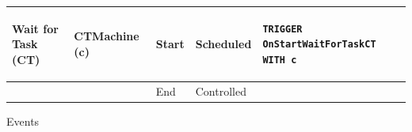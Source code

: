 \documentclass[
  10pt,
  a4paperpaper,
  DIV=11,
  numbers=noendperiod,
  oneside]{scrreprt}
\begin{document}
\begin{longtable}{@{}>{\raggedright\arraybackslash}p{1.8cm}>{\raggedright\arraybackslash}p{2.1cm}>{\raggedright\arraybackslash}p{0.9cm}>{\raggedright\arraybackslash}p{2.2cm}>{\raggedright\arraybackslash}p{8cm}@{}}
  \\ \midrule
  Wait for Task (CT) & CTMachine (c)  & Start & Scheduled  &
  \begin{lstlisting}[language=CMPseudo]
TRIGGER OnStartWaitForTaskCT WITH c
  \end{lstlisting}
  \\ \cmidrule{3-5}
                    &              & End   & Controlled &
  \\ \bottomrule
  

\end{longtable}

\begin{longtable}{@{}>{\raggedright\arraybackslash}p{1.5cm}>{\raggedright\arraybackslash}p{2.1cm}>{\raggedright\arraybackslash}p{2.2cm}>{\raggedright\arraybackslash}p{10cm}@{}}

\caption{\label{tbl-events_lab1}Events}

\tabularnewline


\end{longtable}
\end{document}
